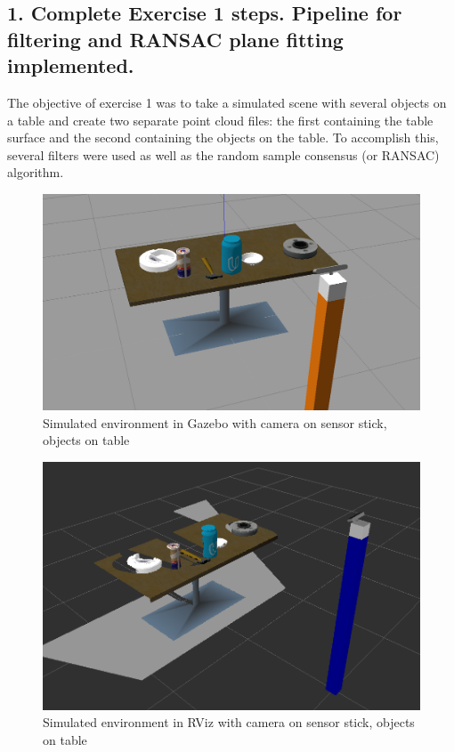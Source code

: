 \documentclass{article}
\begin{document}
\subsection{1. Complete Exercise 1 steps. Pipeline for filtering and RANSAC plane fitting implemented.}

The objective of exercise 1 was to take a simulated scene with several objects on a table and create two separate point cloud files: the first containing the table surface and the second containing the objects on the table. To accomplish this, several filters were used as well as the random sample consensus (or RANSAC) algorithm.

\begin{figure}[H]
    \includegraphics[width=\linewidth]{gazeboscene.png}
    \caption{Simulated environment in Gazebo with camera on sensor stick, objects on table}
    \label{fig:gazebo}
\end{figure}

\begin{figure}[H]
    \includegraphics[width=\linewidth]{scene.png}
    \caption{Simulated environment in RViz with camera on sensor stick, objects on table}
    \label{fig:scene}
\end{figure}
\end{document}

